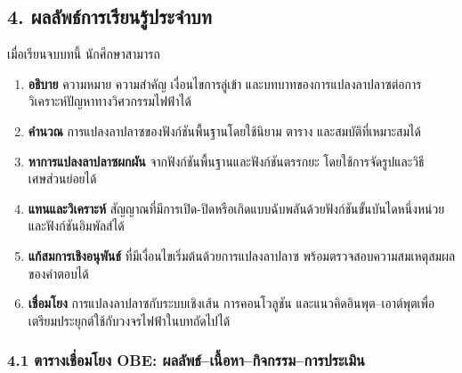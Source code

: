 \subsection{4. ผลลัพธ์การเรียนรู้ประจำบท}

เมื่อเรียนจบบทนี้ นักศึกษาสามารถ

\begin{enumerate}
    \item \textbf{อธิบาย} ความหมาย ความสำคัญ เงื่อนไขการลู่เข้า และบทบาทของการแปลงลาปลาซต่อการวิเคราะห์ปัญหาทางวิศวกรรมไฟฟ้าได้
    \item \textbf{คำนวณ} การแปลงลาปลาซของฟังก์ชันพื้นฐานโดยใช้นิยาม ตาราง และสมบัติที่เหมาะสมได้
    \item \textbf{หาการแปลงลาปลาซผกผัน} จากฟังก์ชันพื้นฐานและฟังก์ชันตรรกยะ โดยใช้การจัดรูปและวิธีเศษส่วนย่อยได้
    \item \textbf{แทนและวิเคราะห์} สัญญาณที่มีการเปิด-ปิดหรือเกิดแบบฉับพลันด้วยฟังก์ชันขั้นบันไดหนึ่งหน่วยและฟังก์ชันอิมพัลส์ได้
    \item \textbf{แก้สมการเชิงอนุพันธ์} ที่มีเงื่อนไขเริ่มต้นด้วยการแปลงลาปลาซ พร้อมตรวจสอบความสมเหตุสมผลของคำตอบได้
    \item \textbf{เชื่อมโยง} การแปลงลาปลาซกับระบบเชิงเส้น การคอนโวลูชัน และแนวคิดอินพุต–เอาต์พุตเพื่อเตรียมประยุกต์ใช้กับวงจรไฟฟ้าในบทถัดไปได้
\end{enumerate}

\subsubsection{4.1 ตารางเชื่อมโยง OBE: ผลลัพธ์–เนื้อหา–กิจกรรม–การประเมิน}

